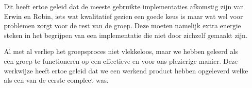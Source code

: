 \documentclass{report}
\begin{document}
Dit heeft ertoe geleid dat de meeste gebruikte implementaties afkomstig zijn van Erwin en Robin, iets wat kwalitatief gezien een goede keus is maar wat wel voor problemen zorgt voor de rest van de groep. Deze moeten namelijk extra energie steken in het begrijpen van een implementatie die niet door zichzelf gemaakt zijn.
\newline

Al met al verliep het groepsproces niet vlekkeloos, maar we hebben geleerd als een groep te functioneren op een effectieve en voor ons plezierige manier. Deze werkwijze heeft ertoe geleid dat we een werkend product hebben opgeleverd welke als een van de eerste compleet was.
\end{document}
